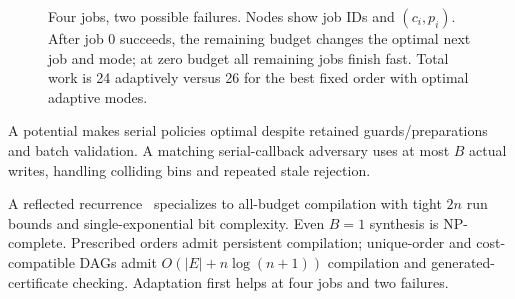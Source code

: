 \documentclass[acmsmall,screen,review,anonymous]{acmart}
\begin{document}
\begin{figure}[ht]
\centering
\begin{minipage}[c]{.44\linewidth}
\centering
{}
\end{minipage}\hfill
\begin{minipage}[c]{.53\linewidth}
\centering
{}
\end{minipage}
\caption{Four jobs, two possible failures. Nodes show job IDs and $(c_i,p_i)$. After job 0 succeeds, the remaining budget changes the optimal next job and mode; at zero budget all remaining jobs finish fast. Total work is 24 adaptively versus 26 for the best fixed order with optimal adaptive modes.}
\label{fig:adaptation}
\end{figure}

A potential makes serial policies optimal despite retained guards/preparations and batch validation. A matching serial-callback adversary uses at most $B$ actual writes, handling colliding bins and repeated stale rejection.

A reflected recurrence~\cite{bkr} specializes to all-budget compilation with tight $2n$ run bounds and single-exponential bit complexity. Even $B=1$ synthesis is NP-complete. Prescribed orders admit persistent compilation; unique-order and cost-compatible DAGs admit $O(|E|+n\log(n+1))$ compilation and generated-certificate checking. Adaptation first helps at four jobs and two failures.
\end{document}
